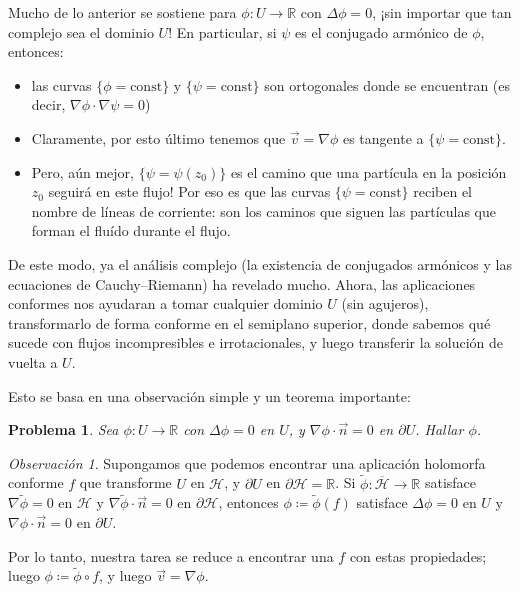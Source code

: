 \documentclass{article}
\newcommand{\realNumbers}{\mathbb{R}}
\newcommand{\upperHalfPlane}{\mathcal{H}}
\newtheorem{problem}{Problema}
\theoremstyle{remark}
\newtheorem{remark}{Observación}
\begin{document}
  Mucho de lo anterior se sostiene para \(\phi : U \rightarrow \realNumbers\) con \(\Delta \phi = 0\), ¡sin importar que tan complejo sea el dominio \(U\)!
  En particular, si \(\psi\) es el conjugado armónico de \(\phi\), entonces:
  \begin{itemize}
    \item las curvas \(\{\phi = \text{const}\}\) y \(\{\psi = \text{const}\}\) son ortogonales donde se encuentran (es decir, \(\nabla \phi \cdot \nabla \psi = 0\))
    \item Claramente, por esto último tenemos que \(\vec{v} = \nabla \phi\) es tangente a \(\{\psi = \text{const}\}\).
    \item Pero, aún mejor, \(\{\psi = \psi(z_0)\}\) es el camino que una partícula en la posición \(z_0\) seguirá en este flujo!
    Por eso es que las curvas \(\{\psi = \text{const}\}\) reciben el nombre de líneas de corriente:
    son los caminos que siguen las partículas que forman el fluído durante el flujo.
  \end{itemize}

  De este modo, ya el análisis complejo (la existencia de conjugados armónicos y las ecuaciones de Cauchy--Riemann) ha revelado mucho.
  Ahora, las aplicaciones conformes nos ayudaran a tomar cualquier dominio \(U\) (sin agujeros), transformarlo de forma conforme en el semiplano superior, donde sabemos qué sucede con flujos incompresibles e irrotacionales, y luego transferir la solución de vuelta a \(U\).

  Esto se basa en una observación simple y un teorema importante:
  \begin{problem}
    Sea \(\phi : U \rightarrow \realNumbers\) con \(\Delta \phi = 0\) en \(U\), y \(\nabla \phi \cdot \vec{n} = 0\) en \(\partial U\).
    Hallar \(\phi\).
  \end{problem}

  \begin{remark}
    Supongamos que podemos encontrar una aplicación holomorfa conforme \(f\) que transforme \(U\) en \(\upperHalfPlane\), y \(\partial U\) en \(\partial \upperHalfPlane = \realNumbers\).
    Si \(\tilde{\phi} : \overline{\upperHalfPlane} \rightarrow \realNumbers\) satisface \(\nabla \tilde{\phi} = 0\) en \(\upperHalfPlane\) y \(\nabla \tilde{\phi} \cdot \vec{n} = 0\) en \(\partial \upperHalfPlane\), entonces \(\phi \coloneqq \tilde{\phi}(f) \) satisface \(\Delta \phi = 0\) en \(U\) y \(\nabla \phi \cdot \vec{n} = 0\) en \(\partial U\).

    Por lo tanto, nuestra tarea se reduce a encontrar una \(f\) con estas propiedades;
    luego \(\phi \coloneqq \tilde{\phi} \circ f\), y luego \(\vec{v} = \nabla \phi\).
  \end{remark}
\end{document}

